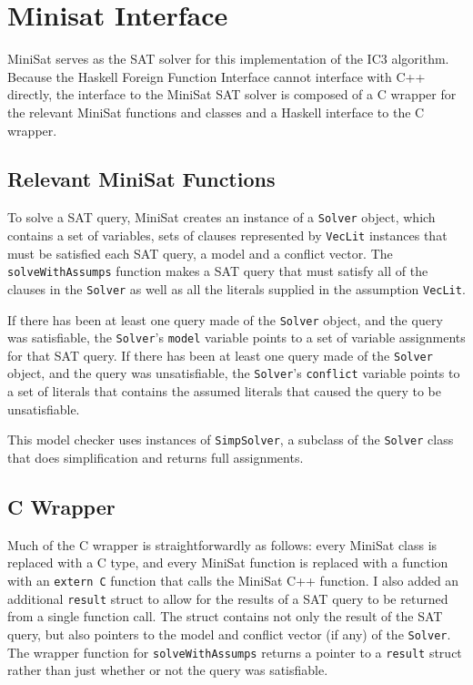 \documentclass[12pt,a4paper,twoside,openright]{report}
\begin{document}
\section{Minisat Interface}

MiniSat serves as the SAT solver for this implementation of the IC3 algorithm.
Because the Haskell Foreign Function Interface cannot interface with C++ directly,
the interface to the MiniSat SAT solver is composed of a C wrapper for the relevant
MiniSat functions and classes and a Haskell interface to the C wrapper.

\subsection{Relevant MiniSat Functions}

To solve a SAT query, MiniSat creates an instance of a \verb,Solver, object,
which contains a set of variables, sets of clauses represented by \verb,VecLit, instances
that must be satisfied each SAT query, a model and a conflict vector.
The \verb,solveWithAssumps, function makes a SAT query that must satisfy all of the clauses
in the \verb,Solver, as well as all the literals supplied in the assumption \verb,VecLit,.

If there has been at least one query made of the \verb,Solver, object, and the query was
satisfiable, the \verb,Solver,'s \verb,model, variable points to a set of variable assignments
for that SAT query.
If there has been at least one query made of the \verb,Solver, object, and the query was
unsatisfiable, the \verb,Solver,'s \verb,conflict, variable points to a set of literals that
contains the assumed literals that caused the query to be unsatisfiable.

This model checker uses instances of \verb,SimpSolver,, a subclass of the \verb,Solver, class
that does simplification and returns full assignments.

\subsection{C Wrapper}

Much of the C wrapper is straightforwardly as follows: every MiniSat class is replaced with a C
type, and every MiniSat function is replaced with a function with an \verb,extern C, function that
calls the MiniSat C++ function.
I also added an additional \verb,result, struct to allow for the results of a SAT query to
be returned from a single function call. The struct contains not only the result of the SAT
query, but also pointers to the model and conflict vector (if any) of the \verb,Solver,.
The wrapper function for \verb,solveWithAssumps, returns a pointer to a \verb,result, struct
rather than just whether or not the query was satisfiable.
\end{document}
